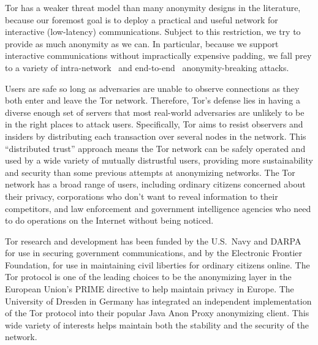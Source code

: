 \documentclass{llncs}
\begin{document}
Tor has a weaker threat model than many anonymity designs in the
literature, because our foremost goal is to deploy a
practical and useful network for interactive (low-latency) communications.
Subject to this restriction, we try to
provide as much anonymity as we can. In particular, because we
support interactive communications without impractically expensive padding,
we fall prey to a variety
of intra-network~\cite{back01,attack-tor-oak05,flow-correlation04} and
end-to-end~\cite{danezis-pet2004,SS03} anonymity-breaking attacks.

Users are safe so long as adversaries are unable to
observe connections as they both enter and leave the Tor network.
Therefore, Tor's defense lies in having a diverse enough set of servers
that most real-world
adversaries are unlikely to be in the right places to attack users.
Specifically,
Tor aims to resist observers and insiders by distributing each transaction
over several nodes in the network.  This ``distributed trust'' approach
means the Tor network can be safely operated and used by a wide variety
of mutually distrustful users, providing more sustainability and security
than some previous attempts at anonymizing networks.
The Tor network has a broad range of users, including ordinary citizens
concerned about their privacy, corporations
who don't want to reveal information to their competitors, and law
enforcement and government intelligence agencies who need
to do operations on the Internet without being noticed.

Tor research and development has been funded by the U.S.~Navy and DARPA
for use in securing government
communications, and by the Electronic Frontier Foundation, for use
in maintaining civil liberties for ordinary citizens online. The Tor
protocol is one of the leading choices
to be the anonymizing layer in the European Union's PRIME directive to
help maintain privacy in Europe. The University of Dresden in Germany
has integrated an independent implementation of the Tor protocol into
their popular Java Anon Proxy anonymizing client. This wide variety of
interests helps maintain both the stability and the security of the
network.
\end{document}
